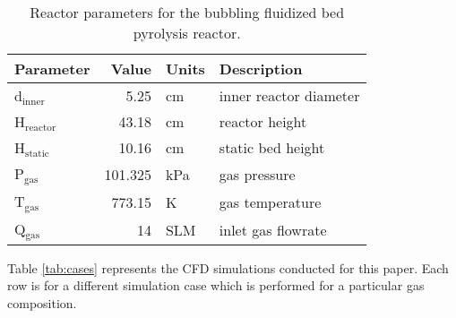\begin{table}[H]
    \centering
    \caption{Reactor parameters for the bubbling fluidized bed pyrolysis reactor.}
    \label{tab:params-reactor}
    \begin{tabular}{lrll}
        \toprule
        Parameter & Value & Units & Description \\
        \midrule
        d$_\textrm{inner}$    & 5.25     & cm   & inner reactor diameter  \\
        H$_\textrm{reactor}$  & 43.18    & cm   & reactor height          \\
        H$_\textrm{static}$   & 10.16    & cm   & static bed height       \\
        P$_\textrm{gas}$      & 101.325  & kPa  & gas pressure            \\
        T$_\textrm{gas}$      & 773.15   & K    & gas temperature         \\
        Q$_\textrm{gas}$      & 14       & SLM  & inlet gas flowrate      \\
        \bottomrule
    \end{tabular}
\end{table}

Table \ref{tab:cases} represents the CFD simulations conducted for this paper. Each row is for a different simulation case which is performed for a particular gas composition.

